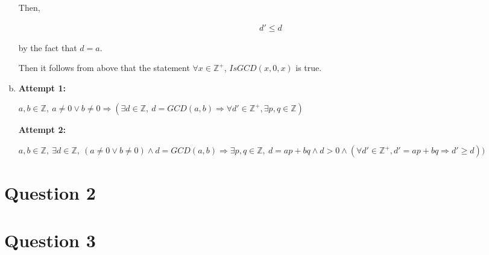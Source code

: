 \documentclass[12pt]{article}
\begin{document}
\begin{enumerate}[a.]
    \bigskip

    Then,

    \begin{align}
        d' \leq d
    \end{align}

    by the fact that $d = a$.

    \bigskip

    Then it follows from above that the statement $\forall x \in \mathbb{Z}^{+}$,
    $IsGCD(x,0,x)$ is true.

    \item

    \textbf{Attempt 1:}

    $a,b \in \mathbb{Z},\:a \neq 0 \lor b \neq 0 \Rightarrow (\exists d \in \mathbb{Z},
    \:d=GCD(a,b) \Rightarrow \forall d' \in \mathbb{Z}^{+}, \exists p,q \in \mathbb{Z})$

    \textbf{Attempt 2:}

    $a,b \in \mathbb{Z},\:\exists d \in \mathbb{Z},\:(a \neq 0 \lor b \neq 0)
    \land d=GCD(a,b) \Rightarrow \exists p,q \in \mathbb{Z},\:d = ap + bq \land
    d > 0 \land (\forall d' \in \mathbb{Z}^{+}, d' = ap + bq \Rightarrow d' \geq d))$



\end{enumerate}

\section*{Question 2}

\section*{Question 3}
\end{document}
